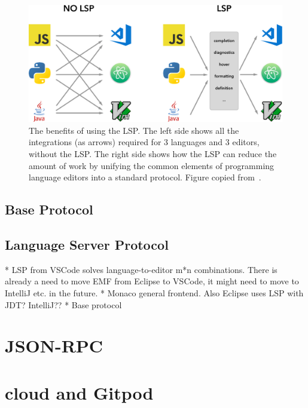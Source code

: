 \begin{figure}[htbp]  %
  \centering
  \includegraphics[width=\textwidth]{figures/pre-project/lsp-languages-editors.png}
  \caption[The Language Server Protocol Benefits]{The benefits of using the \acrshort{LSP}. The left side shows all the integrations (as arrows) required for 3 languages and 3 editors, without the \acrshort{LSP}.
  The right side shows how the \acrshort{LSP} can reduce the amount of work by unifying the common elements of programming language editors into a standard protocol. Figure copied from~\textcite{microsoftLanguageServerExtension2020}.}\label{fig:lsp-m-times-n}
\end{figure}

\subsection{Base Protocol}\label{sec:base-protocol}

\subsection{Language Server Protocol}
* LSP from VSCode solves language-to-editor m*n combinations. There is already a need to move EMF from Eclipse to VSCode, it might need to move to IntelliJ etc. in the future.
* Monaco general frontend. Also Eclipse uses LSP with JDT? IntelliJ??
* Base protocol 

\section{JSON-RPC}

\section{\Gls{cloud} and \gls{Gitpod}}

